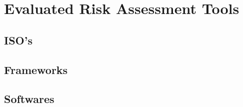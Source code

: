 
%

\chapter{Evaluated Risk Assessment Tools}
\label{cha:evaluated_risk_assessment_tools}

\section{ISO's}
\label{sec:isos}

\section{Frameworks}
\label{sec:frameworks}

\section{Softwares}
\label{sec:softwares}

